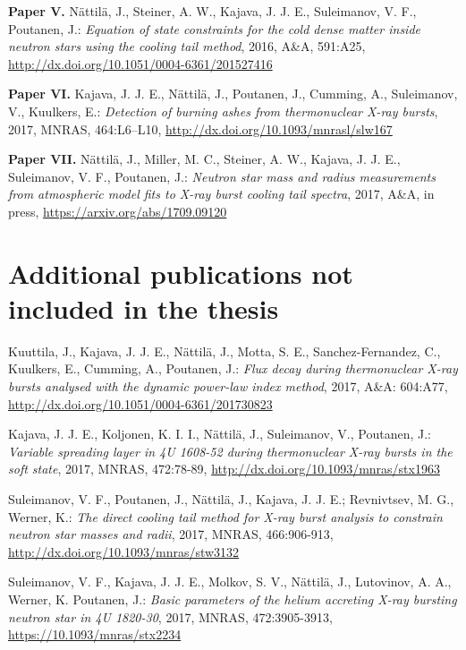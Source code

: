 \hspace{15pt}\textbf{Paper V.} Nättilä, J., Steiner, A. W., Kajava, J. J. E., Suleimanov, V. F., Poutanen, J.: 
\textit{Equation of state constraints for the cold dense matter inside neutron stars using the cooling tail method}, 
2016, A\&A, 591:A25, 
\url{http://dx.doi.org/10.1051/0004-6361/201527416}
 
\vspace{0.3cm}
\textbf{Paper VI.} Kajava, J. J. E., Nättilä, J., Poutanen, J., Cumming, A., Suleimanov, V., Kuulkers, E.: 
\textit{Detection of burning ashes from thermonuclear X-ray bursts}, 
2017, MNRAS, 464:L6–L10, 
\url{http://dx.doi.org/10.1093/mnrasl/slw167}

\vspace{0.3cm}
\textbf{Paper VII.} Nättilä, J., Miller, M. C., Steiner, A. W., Kajava, J. J. E., Suleimanov, V. F., Poutanen, J.: 
\textit{Neutron star mass and radius measurements from atmospheric model fits to X-ray burst cooling tail spectra}, 
2017, A\&A, in press, 
\url{https://arxiv.org/abs/1709.09120}




\newpage
\section*{Additional publications not included in the thesis}

\vspace{0.3cm}
\hspace{15pt} Kuuttila, J., Kajava, J. J. E., Nättilä, J., Motta, S. E., Sanchez-Fernandez, C., Kuulkers, E., Cumming, A., Poutanen, J.: 
\textit{Flux decay during thermonuclear X-ray bursts analysed with the dynamic power-law index method}, 
2017, A\&A: 604:A77, 
\url{http://dx.doi.org/10.1051/0004-6361/201730823}
 

\vspace{0.3cm}
 Kajava, J. J. E., Koljonen, K. I. I., Nättilä, J., Suleimanov, V., Poutanen, J.: 
\textit{Variable spreading layer in 4U 1608-52 during thermonuclear X-ray bursts in the soft state}, 2017, 
MNRAS, 472:78-89, 
\url{http://dx.doi.org/10.1093/mnras/stx1963}


\vspace{0.3cm}
 Suleimanov, V. F., Poutanen, J., Nättilä, J., Kajava, J. J. E.; Revnivtsev, M. G., Werner, K.: 
\textit{The direct cooling tail method for X-ray burst analysis to constrain neutron star masses and radii}, 
2017, MNRAS, 466:906-913, 
\url{http://dx.doi.org/10.1093/mnras/stw3132}
 

\vspace{0.3cm}
 Suleimanov, V. F., Kajava, J. J. E., Molkov, S. V., Nättilä, J., Lutovinov, A. A., Werner, K. Poutanen, J.: 
\textit{Basic parameters of the helium accreting X-ray bursting neutron star in 4U 1820-30}, 
2017, MNRAS, 472:3905-3913,
\url{https://10.1093/mnras/stx2234}

